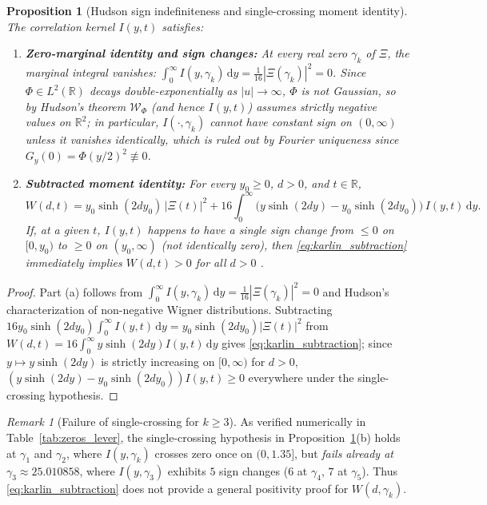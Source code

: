\documentclass[11pt,a4paper,reqno]{amsart}
\newtheorem{proposition}[theorem]{Proposition}
\theoremstyle{definition}
\theoremstyle{remark}
\newtheorem{remark}[theorem]{Remark}
\numberwithin{equation}{section}
\newcommand{\dd}{\mathrm{d}}
\newcommand{\Wig}{\mathcal{W}}
\begin{document}
\begin{proposition}[Hudson sign indefiniteness and single-crossing moment identity]\label{prop:hudson_karlin}
The correlation kernel $I(y,t)$ satisfies:
\begin{enumerate}
\item[\textup{(a)}] \textbf{Zero-marginal identity and sign changes:} At every real zero $\gamma_k$ of $\Xi$, the marginal integral vanishes: $\int_0^\infty I(y,\gamma_k)\,\dd y = \frac{1}{16}|\Xi(\gamma_k)|^2 = 0$. Since $\Phi \in L^2(\mathbb{R})$ decays double-exponentially as $|u|\to\infty$, $\Phi$ is not Gaussian, so by Hudson's theorem \cite{Hudson1974} $\Wig_\Phi$ (and hence $I(y,t)$) assumes strictly negative values on $\mathbb{R}^2$; in particular, $I(\cdot,\gamma_k)$ cannot have constant sign on $(0,\infty)$ unless it vanishes identically, which is ruled out by Fourier uniqueness since $G_y(0) = \Phi(y/2)^2 \not\equiv 0$.
\item[\textup{(b)}] \textbf{Subtracted moment identity:} For every $y_0 \ge 0$, $d > 0$, and $t \in \mathbb{R}$,
\begin{equation}\label{eq:karlin_subtraction}
W(d,t) = y_0\sinh(2d y_0)\,\big|\Xi(t)\big|^2 + 16\int_0^\infty \big(y\sinh(2d y) - y_0\sinh(2d y_0)\big)\,I(y,t)\,\dd y.
\end{equation}
If, at a given $t$, $I(y,t)$ happens to have a \emph{single} sign change from $\le 0$ on $[0,y_0)$ to $\ge 0$ on $(y_0,\infty)$ (not identically zero), then \eqref{eq:karlin_subtraction} immediately implies $W(d,t) > 0$ for all $d > 0$ \cite{Karlin1968}.
\end{enumerate}
\end{proposition}

\begin{proof}
Part (a) follows from $\int_0^\infty I(y,\gamma_k)\,\dd y = \frac{1}{16}|\Xi(\gamma_k)|^2 = 0$ and Hudson's characterization \cite{Hudson1974} of non-negative Wigner distributions. Subtracting $16 y_0\sinh(2d y_0)\int_0^\infty I(y,t)\,\dd y = y_0\sinh(2d y_0)|\Xi(t)|^2$ from $W(d,t) = 16\int_0^\infty y\sinh(2d y)I(y,t)\,\dd y$ gives \eqref{eq:karlin_subtraction}; since $y \mapsto y\sinh(2d y)$ is strictly increasing on $[0,\infty)$ for $d > 0$, $(y\sinh(2d y) - y_0\sinh(2d y_0))I(y,t) \ge 0$ everywhere under the single-crossing hypothesis.
\end{proof}

\begin{remark}[Failure of single-crossing for $k \ge 3$]\label{rem:multicrossing}
As verified numerically in Table~\ref{tab:zeros_lever}, the single-crossing hypothesis in Proposition~\ref{prop:hudson_karlin}(b) holds at $\gamma_1$ and $\gamma_2$, where $I(y,\gamma_k)$ crosses zero once on $(0, 1.35]$, but \emph{fails already at $\gamma_3 \approx 25.010858$}, where $I(y,\gamma_3)$ exhibits $5$ sign changes ($6$ at $\gamma_4$, $7$ at $\gamma_5$). Thus \eqref{eq:karlin_subtraction} does not provide a general positivity proof for $W(d,\gamma_k)$.
\end{remark}
\end{document}
